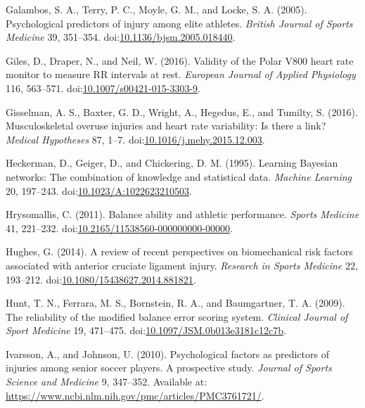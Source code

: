 \documentclass[
]{frontiersHLTH}
\newlength{\cslhangindent}
\newenvironment{cslreferences}%
  {\setlength{\parindent}{0pt}%
  \everypar{\setlength{\hangindent}{\cslhangindent}}\ignorespaces}%
  {\par}
\begin{document}
\begin{cslreferences}
\leavevmode\hypertarget{ref-Galambos2005}{}%
Galambos, S. A., Terry, P. C., Moyle, G. M., and Locke, S. A. (2005).
Psychological predictors of injury among elite athletes. \emph{British
Journal of Sports Medicine} 39, 351--354.
doi:\href{https://doi.org/10.1136/bjsm.2005.018440}{10.1136/bjsm.2005.018440}.

\leavevmode\hypertarget{ref-Giles2016}{}%
Giles, D., Draper, N., and Neil, W. (2016). Validity of the Polar V800
heart rate monitor to measure RR intervals at rest. \emph{European
Journal of Applied Physiology} 116, 563--571.
doi:\href{https://doi.org/10.1007/s00421-015-3303-9}{10.1007/s00421-015-3303-9}.

\leavevmode\hypertarget{ref-Gisselman2016}{}%
Gisselman, A. S., Baxter, G. D., Wright, A., Hegedus, E., and Tumilty,
S. (2016). Musculoskeletal overuse injuries and heart rate variability:
Is there a link? \emph{Medical Hypotheses} 87, 1--7.
doi:\href{https://doi.org/10.1016/j.mehy.2015.12.003}{10.1016/j.mehy.2015.12.003}.

\leavevmode\hypertarget{ref-Heckerman1995}{}%
Heckerman, D., Geiger, D., and Chickering, D. M. (1995). Learning
Bayesian networks: The combination of knowledge and statistical data.
\emph{Machine Learning} 20, 197--243.
doi:\href{https://doi.org/10.1023/A:1022623210503}{10.1023/A:1022623210503}.

\leavevmode\hypertarget{ref-Hrysomallis2011}{}%
Hrysomallis, C. (2011). Balance ability and athletic performance.
\emph{Sports Medicine} 41, 221--232.
doi:\href{https://doi.org/10.2165/11538560-000000000-00000}{10.2165/11538560-000000000-00000}.

\leavevmode\hypertarget{ref-Hughes2014}{}%
Hughes, G. (2014). A review of recent perspectives on biomechanical risk
factors associated with anterior cruciate ligament injury.
\emph{Research in Sports Medicine} 22, 193--212.
doi:\href{https://doi.org/10.1080/15438627.2014.881821}{10.1080/15438627.2014.881821}.

\leavevmode\hypertarget{ref-Hunt2009}{}%
Hunt, T. N., Ferrara, M. S., Bornstein, R. A., and Baumgartner, T. A.
(2009). The reliability of the modified balance error scoring system.
\emph{Clinical Journal of Sport Medicine} 19, 471--475.
doi:\href{https://doi.org/10.1097/JSM.0b013e3181c12c7b}{10.1097/JSM.0b013e3181c12c7b}.

\leavevmode\hypertarget{ref-Ivarsson2010}{}%
Ivarsson, A., and Johnson, U. (2010). Psychological factors as
predictors of injuries among senior soccer players. A prospective study.
\emph{Journal of Sports Science and Medicine} 9, 347--352. Available at:
\url{https://www.ncbi.nlm.nih.gov/pmc/articles/PMC3761721/}.


\end{cslreferences}
\end{document}
